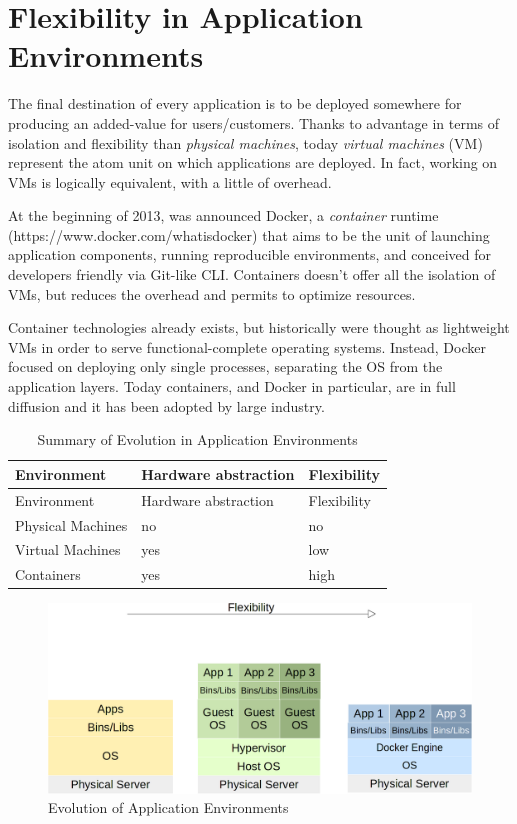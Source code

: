 \section{Flexibility in Application
Environments}\label{flexibility-in-application-environments}

The final destination of every application is to be deployed somewhere
for producing an added-value for users/customers. Thanks to advantage in
terms of isolation and flexibility than \emph{physical machines}, today
\emph{virtual machines} (VM) represent the atom unit on which
applications are deployed. In fact, working on VMs is logically
equivalent, with a little of overhead.

At the beginning of 2013, was announced Docker, a \emph{container}
runtime (https://www.docker.com/whatisdocker) that aims to be the unit
of launching application components, running reproducible environments,
and conceived for developers friendly via Git-like CLI. Containers
doesn't offer all the isolation of VMs, but reduces the overhead and
permits to optimize resources.

Container technologies already exists, but historically were thought as
lightweight VMs in order to serve functional-complete operating systems.
Instead, Docker focused on deploying only single processes, separating
the OS from the application layers. Today containers, and Docker in
particular, are in full diffusion and it has been adopted by large
industry.

\begin{longtable}[c]{@{}lll@{}}
\caption{Summary of Evolution in Application
Environments}\tabularnewline
\toprule
Environment & Hardware abstraction & Flexibility\tabularnewline
\midrule
\endfirsthead
\toprule
Environment & Hardware abstraction & Flexibility\tabularnewline
\midrule
\endhead
Physical Machines & no & no\tabularnewline
Virtual Machines & yes & low\tabularnewline
Containers & yes & high\tabularnewline
\bottomrule
\end{longtable}

\begin{figure}[htbp]
\centering
\includegraphics{media/ch2-containers.png}
\caption{Evolution of Application Environments}
\end{figure}

